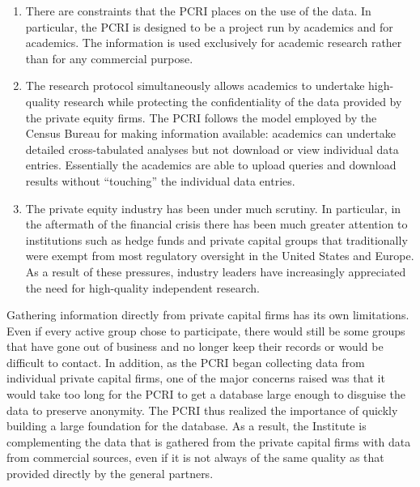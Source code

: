 \begin{enumerate}
\def\labelenumi{\arabic{enumi}.}
\item
  There are constraints that the PCRI places on the use of the data. In particular, the PCRI is designed to be a project run by academics and for academics. The information is used exclusively for academic research rather than for any commercial purpose.
\item
  The research protocol simultaneously allows academics to undertake high-quality research while protecting the confidentiality of the data provided by the private equity firms. The PCRI follows the model employed by the Census Bureau for making information available: academics can undertake detailed cross-tabulated analyses but not download or view individual data entries. Essentially the academics are able to upload queries and download results without ``touching'' the individual data entries.
\item
  The private equity industry has been under much scrutiny. In particular, in the aftermath of the financial crisis there has been much greater attention to institutions such as hedge funds and private capital groups that traditionally were exempt from most regulatory oversight in the United States and Europe. As a result of these pressures, industry leaders have increasingly appreciated the need for high-quality independent research.
\end{enumerate}

Gathering information directly from private capital firms has its own limitations. Even if every active group chose to participate, there would still be some groups that have gone out of business and no longer keep their records or would be difficult to contact. In addition, as the PCRI began collecting data from individual private capital firms, one of the major concerns raised was that it would take too long for the PCRI to get a database large enough to disguise the data to preserve anonymity. The PCRI thus realized the importance of quickly building a large foundation for the database. As a result, the Institute is complementing the data that is gathered from the private capital firms with data from commercial sources, even if it is not always of the same quality as that provided directly by the general partners.

